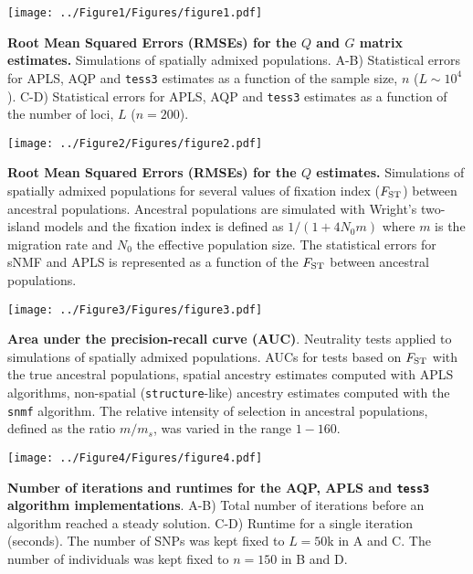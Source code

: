 \clearpage
\newpage


\begin{center}
\texttt{[image: ../Figure1/Figures/figure1.pdf]}
\end{center}
 {\bf Root Mean Squared Errors (RMSEs) for the $Q$ and $G$ matrix estimates.} Simulations of spatially admixed populations. A-B) Statistical errors for APLS, AQP and {\tt tess3} estimates as a function of the sample size, $n$ ($L \sim 10^4$). C-D) Statistical errors for APLS, AQP and {\tt tess3} estimates as a function of the number of loci, $L$ ($n = 200$).

\clearpage
\newpage


\begin{center}
\texttt{[image: ../Figure2/Figures/figure2.pdf]}
\end{center}
 {\bf Root Mean Squared Errors (RMSEs) for the $Q$ estimates.} Simulations of spatially admixed populations for several values of fixation index ($F_{\rm ST}$) between ancestral populations. Ancestral populations are simulated with Wright’s two-island models and the fixation index is defined as $1 / (1 + 4 N_0 m)$ where $m$ is the migration rate and $N_0$ the effective population size. The statistical errors for sNMF and APLS is represented as a function of the $F_{\rm ST}$ between ancestral populations.

\clearpage
\newpage

\begin{center}
\texttt{[image: ../Figure3/Figures/figure3.pdf]}
\end{center}
 {\bf Area under the precision-recall curve (AUC)}. Neutrality tests applied to simulations of spatially admixed populations. AUCs for tests based on $F_{\rm ST}$ with the true ancestral populations,  spatial ancestry estimates computed with APLS algorithms, non-spatial ({\tt structure}-like) ancestry estimates computed with the {\tt snmf} algorithm. The relative intensity of selection in ancestral populations, defined as the ratio $m/m_s$, was varied in the range $1-160$.


\clearpage
\newpage

\begin{center}
\texttt{[image: ../Figure4/Figures/figure4.pdf]}
\end{center}
 {\bf Number of iterations and runtimes for the AQP, APLS and {\tt tess3} algorithm implementations}. A-B)   Total number of iterations before an algorithm reached a steady solution. C-D) Runtime for a single iteration (seconds). The number of SNPs was kept fixed to $L = 50$k in A and C. The number of individuals was kept fixed to $n = 150$ in B and D.


